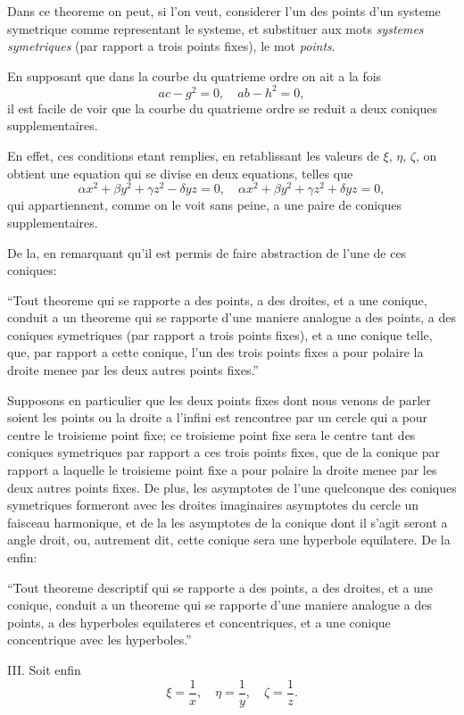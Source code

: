 \documentclass[11pt,a4paper]{book}
\begin{document}
Dans ce theoreme on peut, si l'on veut, considerer l'un des points d'un systeme symetrique comme representant le systeme, et substituer aux mots \textit{systemes symetriques} (par rapport a trois points fixes), le mot \textit{points}.

En supposant que dans la courbe du quatrieme ordre on ait a la fois
\[
ac - g^2 = 0, \quad ab - h^2 = 0,
\]
il est facile de voir que la courbe du quatrieme ordre se reduit a deux coniques supplementaires.

En effet, ces conditions etant remplies, en retablissant les valeurs de $\xi$, $\eta$, $\zeta$, on obtient une equation qui se divise en deux equations, telles que
\[
\alpha x^2 + \beta y^2 + \gamma z^2 - \delta yz = 0, \quad \alpha x^2 + \beta y^2 + \gamma z^2 + \delta yz = 0,
\]
qui appartiennent, comme on le voit sans peine, a une paire de coniques supplementaires.

De la, en remarquant qu'il est permis de faire abstraction de l'une de ces coniques:

``Tout theoreme qui se rapporte a des points, a des droites, et a une conique, conduit a un theoreme qui se rapporte d'une maniere analogue a des points, a des coniques symetriques (par rapport a trois points fixes), et a une conique telle, que, par rapport a cette conique, l'un des trois points fixes a pour polaire la droite menee par les deux autres points fixes.''

Supposons en particulier que les deux points fixes dont nous venons de parler soient les points ou la droite a l'infini est rencontree par un cercle qui a pour centre le troisieme point fixe; ce troisieme point fixe sera le centre tant des coniques symetriques par rapport a ces trois points fixes, que de la conique par rapport a laquelle le troisieme point fixe a pour polaire la droite menee par les deux autres points fixes. De plus, les asymptotes de l'une quelconque des coniques symetriques formeront avec les droites imaginaires asymptotes du cercle un faisceau harmonique, et de la les asymptotes de la conique dont il s'agit seront a angle droit, ou, autrement dit, cette conique sera une hyperbole equilatere. De la enfin:

``Tout theoreme descriptif qui se rapporte a des points, a des droites, et a une conique, conduit a un theoreme qui se rapporte d'une maniere analogue a des points, a des hyperboles equilateres et concentriques, et a une conique concentrique avec les hyperboles.''

\textsc{III.} Soit enfin
\[
\xi = \frac{1}{x}, \quad \eta = \frac{1}{y}, \quad \zeta = \frac{1}{z}.
\]
\end{document}
